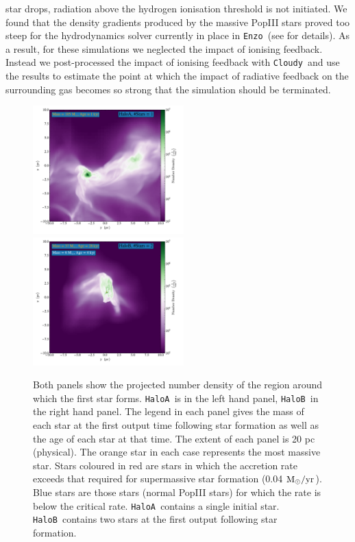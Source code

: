 \documentclass[graphics, twocolumn, usenatbib]{mn2e}
\newcommand{\enzo}{\texttt{Enzo~}}
\newcommand{\cloudy}{\texttt{Cloudy~}}
\newcommand{\msolaryrc} {$\rm{M_{\odot}/yr}$}
\newcommand{\ha} {\texttt{HaloA~}}
\newcommand{\hb} {\texttt{HaloB~}}
\begin{document}
star drops, radiation above the hydrogen ionisation threshold is not initiated. We found that the
density gradients produced by the massive PopIII stars proved too steep for the hydrodynamics solver
currently in place in \enzo (see \cite{Enzo_2014} for details). As a result, for these simulations
we neglected the impact of ionising feedback. Instead we post-processed the impact of
ionising feedback with \cloudy and use the results to estimate the point at which the impact of
radiative feedback on the surrounding gas becomes so strong that the simulation should be terminated.
\begin{figure} 
\centering
\begin{minipage}{175mm}      \begin{center} 
\centerline{
\includegraphics[width=0.52\textwidth]{FIGURES/HaloA/Proj_z_number_density_0001.pdf}
\includegraphics[width=0.52\textwidth]{FIGURES/HaloB/Proj_z_number_density_0028.pdf}}
\caption{Both panels show the projected number density of the region around which the first
  star forms. \ha is in the left hand panel, \hb in the right hand panel.
  The legend in each panel gives the mass of each star at the first output time following star
  formation as well as the age of each star at that time. The extent of each panel is 20 pc (physical). The orange
  star in each case represents the most massive star. Stars coloured in red are stars in which the accretion rate
  exceeds that required for supermassive star formation (0.04 \msolaryrc). Blue stars are those stars (normal PopIII stars) for
  which the rate is below the critical rate. \ha contains a single initial star. \hb contains two stars
  at the first output following star formation.  }\label{Fig:ProjectionStart}
\end{center} \end{minipage}

\end{figure}
\end{document}
